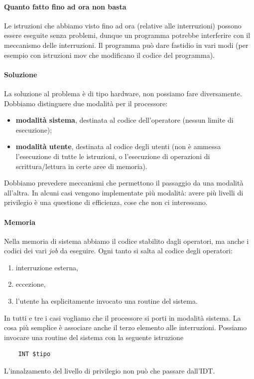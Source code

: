 \documentclass[11pt]{report}
\theoremstyle{definition}
\begin{document}
\paragraph{Quanto fatto fino ad ora non basta} Le istruzioni che abbiamo visto fino ad ora (relative alle interruzioni) possono essere eseguite senza problemi, dunque un programma potrebbe interferire con il meccanismo delle interruzioni. Il programma può dare fastidio in vari modi (per esempio con istruzioni mov che modificano il codice del programma).
\paragraph{Soluzione} La soluzione al problema è di tipo hardware, non possiamo fare diversamente. Dobbiamo distinguere due modalità per il processore:
\begin{itemize}
	\item \textbf{modalità sistema}, destinata al codice dell'operatore (nessun limite di esecuzione);
	\item \textbf{modalità utente}, destinata al codice degli utenti (non è ammessa l'esecuzione di tutte le istruzioni, o l'esecuzione di operazioni di scrittura/lettura in certe aree di memoria).
\end{itemize}
Dobbiamo prevedere meccanismi che permettono il passaggio da una modalità all'altra. In alcuni casi vengono implementate più modalità: avere più livelli di privilegio è una questione di efficienza, cose che non ci interessano.
\paragraph{Memoria} Nella memoria di sistema abbiamo il codice stabilito dagli operatori, ma anche i codici dei vari \emph{job} da eseguire. Ogni tanto si salta al codice degli operatori:
\begin{enumerate}
	\item interruzione esterna,
	\item eccezione,
	\item l'utente ha esplicitamente invocato una routine del sistema.
\end{enumerate}
In tutti e tre i casi vogliamo che il processore si porti in modalità sistema. La cosa più semplice è associare anche il terzo elemento alle interruzioni. Possiamo invocare una routine del sistema con la seguente istruzione
\begin{verbatim}
	INT $tipo
\end{verbatim}
L'innalzamento del livello di privilegio non può che passare dall'IDT.
\end{document}
